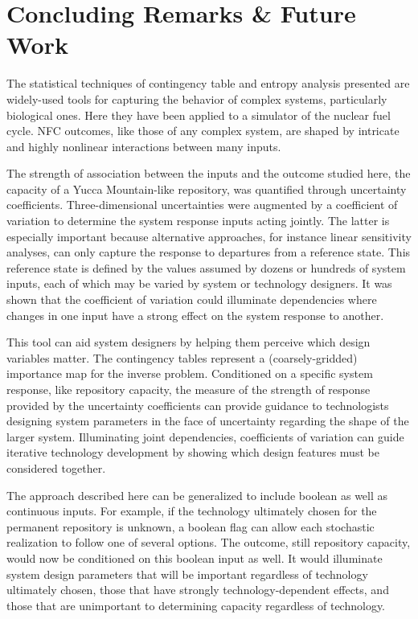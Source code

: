 \section{Concluding Remarks \& Future Work}
\label{cts_sec:conclusion}

The statistical techniques of contingency table and entropy analysis presented 
are widely-used tools for capturing the behavior of complex systems, 
particularly biological ones.  Here they have been applied to a simulator of the 
nuclear fuel cycle.  NFC outcomes, like those of any complex system, are shaped 
by intricate and highly nonlinear interactions between many inputs.

The strength of association between the inputs and the outcome studied here, the 
capacity of a Yucca Mountain-like repository, was quantified through uncertainty 
coefficients.  Three-dimensional uncertainties were augmented by a coefficient of 
variation to determine the system response inputs acting jointly.  The latter is 
especially important because alternative approaches, for instance linear sensitivity 
analyses, can only capture the response to departures from a reference state.  This 
reference state is defined by the values assumed by dozens or hundreds of system 
inputs, each of which may be varied by system or technology designers.  It was 
shown that the coefficient of variation could illuminate dependencies where changes 
in one input have a strong effect on the system response to another.  

This tool can aid system designers by helping them perceive which design variables 
matter.  The contingency tables represent a (coarsely-gridded) importance map for 
the inverse problem.  Conditioned on a specific system response, like repository 
capacity, the measure of the strength of response provided by the uncertainty coefficients 
can provide guidance to technologists designing system parameters in the face of uncertainty 
regarding the shape of the larger system.  Illuminating joint dependencies, coefficients of 
variation can guide iterative technology development by showing which design features must 
be considered together.

The approach described here can be generalized to include boolean as well as continuous inputs.  
For example, if the technology ultimately chosen for the permanent repository is unknown, 
a boolean flag can allow each stochastic realization to follow one of several options.  
The outcome, still repository capacity, would now be conditioned on this boolean input as well.  
It would illuminate system design parameters that will be important regardless of technology 
ultimately chosen, those that have strongly technology-dependent effects, and those that are 
unimportant to determining capacity regardless of technology.  

